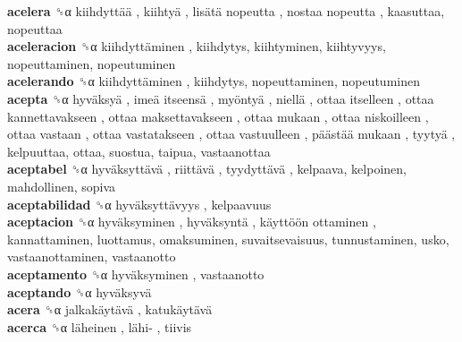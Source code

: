 \textbf{acelera} ␝α   kiihdyttää ,  kiihtyä ,  lisätä nopeutta ,  nostaa nopeutta , kaasuttaa, nopeuttaa  \\
\textbf{aceleracion} ␝α   kiihdyttäminen , kiihdytys, kiihtyminen, kiihtyvyys, nopeuttaminen, nopeutuminen  \\
\textbf{acelerando} ␝α   kiihdyttäminen , kiihdytys, nopeuttaminen, nopeutuminen  \\
\textbf{acepta} ␝α   hyväksyä ,  imeä itseensä ,  myöntyä ,  niellä ,  ottaa itselleen ,  ottaa kannettavakseen ,  ottaa maksettavakseen ,  ottaa mukaan ,  ottaa niskoilleen ,  ottaa vastaan ,  ottaa vastatakseen ,  ottaa vastuulleen ,  päästää mukaan ,  tyytyä , kelpuuttaa, ottaa, suostua, taipua, vastaanottaa  \\
\textbf{aceptabel} ␝α   hyväksyttävä ,  riittävä ,  tyydyttävä , kelpaava, kelpoinen, mahdollinen, sopiva  \\
\textbf{aceptabilidad} ␝α   hyväksyttävyys , kelpaavuus  \\
\textbf{aceptacion} ␝α   hyväksyminen ,  hyväksyntä ,  käyttöön ottaminen , kannattaminen, luottamus, omaksuminen, suvaitsevaisuus, tunnustaminen, usko, vastaanottaminen, vastaanotto  \\
\textbf{aceptamento} ␝α   hyväksyminen , vastaanotto  \\
\textbf{aceptando} ␝α   hyväksyvä   \\
\textbf{acera} ␝α   jalkakäytävä ,  katukäytävä   \\
\textbf{acerca} ␝α   läheinen ,  lähi- , tiivis  \\

